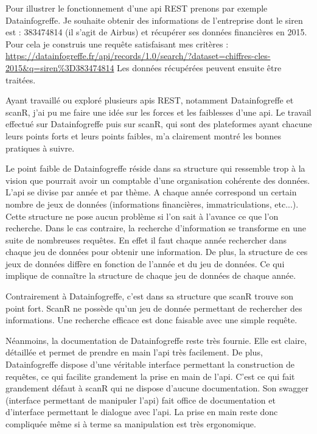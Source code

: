 \documentclass[french]{article}
\begin{document}
{Pour illustrer le fonctionnement d'une api REST prenons par exemple Datainfogreffe. Je souhaite obtenir des informations de l'entreprise dont le siren est : 383474814 (il s'agit de Airbus) et récupérer ses données financières en 2015. Pour cela je construis une requête satisfaisant mes critères :
\url{https://datainfogreffe.fr/api/records/1.0/search/?dataset=chiffres-cles-2015&q=siren%3D383474814}
\newline{}
Les données récupérées peuvent ensuite être traitées.

Ayant travaillé ou exploré plusieurs apis REST, notamment Datainfogreffe et scanR, j'ai pu me faire une idée sur les forces et les faiblesses d'une api. Le travail effectué sur Datainfogreffe puis sur scanR, qui sont des plateformes ayant chacune leurs points forts et leurs points faibles, m'a clairement montré les bonnes pratiques à suivre. 

Le point faible de Datainfogreffe réside dans sa structure qui ressemble trop à la vision que pourrait avoir un comptable d'une organisation cohérente des données. L'api se divise par année et par thème. A chaque année correspond un certain nombre de jeux de données (informations financières, immatriculations, etc...). Cette structure ne pose aucun problème si l'on sait à l'avance ce que l'on recherche. Dans le cas contraire, la recherche d'information se transforme en une suite de nombreuses requêtes. En effet il faut chaque année rechercher dans chaque jeu de données pour obtenir une information. De plus, la structure de ces jeux de données diffère en fonction de l'année et du jeu de données. Ce qui implique de connaître la structure de chaque jeu de données de chaque année.

Contrairement à Datainfogreffe, c'est dans sa structure que scanR trouve son point fort. ScanR ne possède qu'un jeu de donnée permettant de rechercher des informations. Une recherche efficace est donc faisable avec une simple requête.

Néanmoins, la documentation de Datainfogreffe reste très fournie. Elle est claire, détaillée et permet de prendre en main l'api très facilement. De plus, Datainfogreffe dispose d'une véritable interface permettant la construction de requêtes, ce qui facilite grandement la prise en main de l'api.
\newline{}
C'est ce qui fait grandement défaut à scanR qui ne dispose d'aucune documentation. Son swagger (interface permettant de manipuler l'api) fait office de documentation et d'interface permettant le dialogue avec l'api. La prise en main reste donc compliquée même si à terme sa manipulation est très ergonomique.

}
\end{document}
